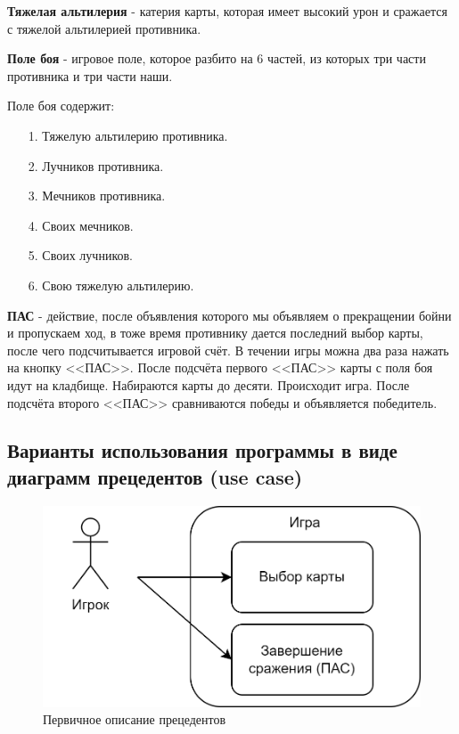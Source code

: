 \documentclass[12pt, a4paper, simple]{eskdtext}
\begin{document}
    \textbf{Тяжелая альтилерия} - катерия карты, которая имеет высокий урон и сражается с тяжелой альтилерией противника.

    \textbf{Поле боя} - игровое поле, которое разбито на 6 частей, из которых три части противника и три части наши.
    
    Поле боя содержит:

    \begin{enumerate}
        \item [1.] Тяжелую альтилерию противника.
        \item [2.] Лучников противника.
        \item [3.] Мечников противника.
        \item [4.] Своих мечников.
        \item [5.] Своих лучников.
        \item [6.] Свою тяжелую альтилерию.
    \end{enumerate}

    \textbf{ПАС} - действие, после объявления которого мы объявляем о прекращении бойни и пропускаем ход, в тоже время противнику дается последний выбор карты,
    после чего подсчитывается игровой счёт. В течении игры можна два раза нажать на кнопку <<ПАС>>.
    После подсчёта первого <<ПАС>> карты с поля боя идут на кладбище. Набираются карты до десяти.
    Происходит игра. После подсчёта второго <<ПАС>> сравниваются победы и объявляется победитель.

    \newpage
    \subsection{Варианты использования программы в виде диаграмм прецедентов (use case)}

    \begin{figure}[!h]
        \centering
        \includegraphics[]
            {_assets/UML_Use_case_diagram.png}
        \caption{Первичное описание прецедентов}
    \end{figure}
\end{document}
